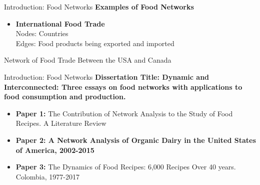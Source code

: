 \documentclass[20]{beamer}
\begin{document}
\begin{frame}{Introduction: Food Networks}
\textbf{Examples of Food Networks}
\\ 
\vspace{0mm}
\begin{itemize}
\item \textbf{International Food Trade}
\\Nodes: Countries
\\Edges: Food products being exported and imported
\end{itemize}

\vspace{0mm}
\centerline{Network of Food Trade Between the USA and Canada }
\vspace{2mm}
\centering
{}


\end{frame}



\begin{frame}{Introduction: Food Networks}
\textbf{Dissertation Title: Dynamic and Interconnected: Three essays on food networks with applications to food consumption and production. }
\\ 
\vspace{5mm}
\begin{itemize}
\item \textbf{Paper 1:} The Contribution of Network Analysis to the Study of Food Recipes. A Literature Review
\item \textbf{Paper 2: A Network Analysis of Organic Dairy in the United States of America, 2002-2015} 
\item \textbf{Paper 3:} {The Dynamics of Food Recipes: 6,000 Recipes Over 40 years. Colombia, 1977-2017}
\end{itemize}
\end{frame}
\end{document}
